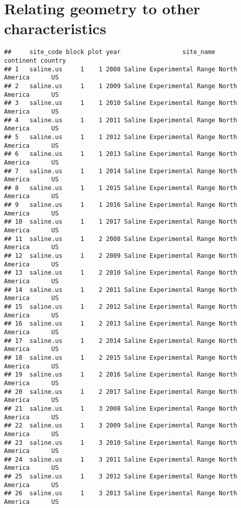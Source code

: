 \documentclass[]{article}
\begin{document}
\hypertarget{relating-geometry-to-other-characteristics}{%
\section{Relating geometry to other
characteristics}\label{relating-geometry-to-other-characteristics}}

\begin{verbatim}
##     site_code block plot year                 site_name     continent country
## 1   saline.us     1    1 2008 Saline Experimental Range North America      US
## 2   saline.us     1    1 2009 Saline Experimental Range North America      US
## 3   saline.us     1    1 2010 Saline Experimental Range North America      US
## 4   saline.us     1    1 2011 Saline Experimental Range North America      US
## 5   saline.us     1    1 2012 Saline Experimental Range North America      US
## 6   saline.us     1    1 2013 Saline Experimental Range North America      US
## 7   saline.us     1    1 2014 Saline Experimental Range North America      US
## 8   saline.us     1    1 2015 Saline Experimental Range North America      US
## 9   saline.us     1    1 2016 Saline Experimental Range North America      US
## 10  saline.us     1    1 2017 Saline Experimental Range North America      US
## 11  saline.us     1    2 2008 Saline Experimental Range North America      US
## 12  saline.us     1    2 2009 Saline Experimental Range North America      US
## 13  saline.us     1    2 2010 Saline Experimental Range North America      US
## 14  saline.us     1    2 2011 Saline Experimental Range North America      US
## 15  saline.us     1    2 2012 Saline Experimental Range North America      US
## 16  saline.us     1    2 2013 Saline Experimental Range North America      US
## 17  saline.us     1    2 2014 Saline Experimental Range North America      US
## 18  saline.us     1    2 2015 Saline Experimental Range North America      US
## 19  saline.us     1    2 2016 Saline Experimental Range North America      US
## 20  saline.us     1    2 2017 Saline Experimental Range North America      US
## 21  saline.us     1    3 2008 Saline Experimental Range North America      US
## 22  saline.us     1    3 2009 Saline Experimental Range North America      US
## 23  saline.us     1    3 2010 Saline Experimental Range North America      US
## 24  saline.us     1    3 2011 Saline Experimental Range North America      US
## 25  saline.us     1    3 2012 Saline Experimental Range North America      US
## 26  saline.us     1    3 2013 Saline Experimental Range North America      US

\end{verbatim}
\end{document}
